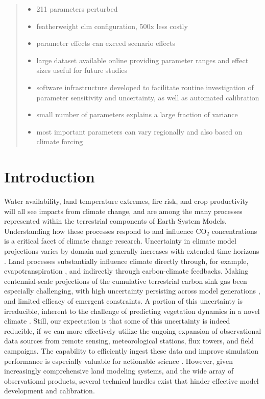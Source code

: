\documentclass[draft]{agujournal2019}
\begin{document}
\begin{abstract}
\begin{itemize}
\item 211 parameters perturbed
\item featherweight clm configuration, 500x less costly
\item parameter effects can exceed scenario effects
\item large dataset available online providing parameter ranges and effect sizes useful for future studies
\item software infrastructure developed to facilitate routine investigation of parameter sensitivity and uncertainty, as well as automated calibration
\item small number of parameters explains a large fraction of variance 
\item most important parameters can vary regionally and also based on climate forcing

\end{itemize}
\end{abstract}


\section{Introduction}
Water availability, land temperature extremes, fire risk, and crop productivity will all see impacts from climate change, and are among the many processes represented within the terrestrial components of Earth System Models. Understanding how these processes respond to and influence CO$_2$ concentrations is a critical facet of climate change research. Uncertainty in climate model projections varies by domain and generally increases with extended time horizons \cite{koven2022}. Land processes substantially influence climate directly through, for example, evapotranspiration \cite{zarakas2024}, and indirectly through carbon-climate feedbacks.
Making centennial-scale projections of the cumulative terrestrial carbon sink gas been especially challenging, with high uncertainty persisting across model generations \cite{friedlingstein2014,arora2020}, and limited efficacy of emergent constraints. A portion of this uncertainty is irreducible, inherent to the challenge of predicting vegetation dynamics in a novel climate \cite{lovenduski2017}. Still, our expectation is that some of this uncertainty is indeed reducible, if we can more effectively utilize the ongoing expansion of observational data sources from remote sensing, meteorological stations, flux towers, and field campaigns. The capability to efficiently ingest these data and improve simulation performance is especially valuable for actionable science \cite{cheng2023}. However, given increasingly comprehensive land modeling systems, and the wide array of observational products, several technical hurdles exist that hinder effective model development and calibration.
\end{document}
